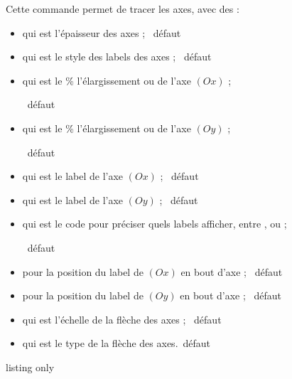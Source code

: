 \begin{cautionblock}
Cette commande permet de tracer les axes, avec des  :

\begin{itemize}
	\item {} qui est l'épaisseur des axes ; \hfill~défaut \Cle{1pt}
	\item {} qui est le style des labels des axes  ; \hfill~défaut 
	\item {}  qui est le \% l'élargissement  ou  de l'axe $(Ox)$ ;
	
	\hfill~défaut 
	\item {}  qui est le \% l'élargissement  ou  de l'axe $(Oy)$ ;
	
	\hfill~défaut 
	\item {} qui est le label de l'axe $(Ox)$ ; \hfill~défaut 
	\item {} qui est le label de l'axe $(Oy)$ ; \hfill~défaut 
	\item {} qui est le code pour préciser quels labels afficher, entre ,  ou  ;
	
	\hfill~défaut 
	\item {} pour la position du label de $(Ox)$ en bout d'axe ; \hfill~défaut 
	\item {} pour la position du label de $(Oy)$ en bout d'axe ; \hfill~défaut 
	\item {} qui est l'échelle de la flèche des axes ; \hfill~défaut 
	\item {} qui est le type de la flèche des axes.\hfill~défaut 
\end{itemize}
\vspace*{-\baselineskip}\leavevmode
\end{cautionblock}

\begin{PresCodeTexPL}{listing only}
\AxesTikz

\AxesTikz%
	[AffLabel=xy,Labelx={Nombre de jours},Labely={Nombre d'individus infectés, en centaines},%
	PosLabelx={above left},PosLabely={above right},%
	Police=\small\sffamily,ElargirOx=0,ElargirOy=0]
\end{PresCodeTexPL}

